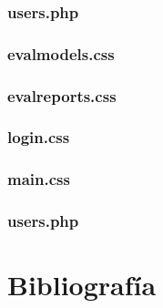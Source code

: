 \documentclass[12pt,a4paper,spanish,twoside]{article}
\begin{document}
\subsubsection{users.php}


\subsubsection{evalmodels.css}

\subsubsection{evalreports.css}

\subsubsection{login.css}

\subsubsection{main.css}

\subsubsection{users.php}


\section{Bibliografía}
\end{document}
